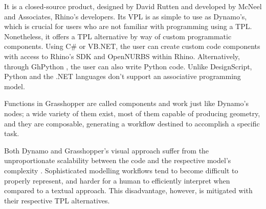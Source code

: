 It is a closed-source product, designed by David Rutten and developed by McNeel
and Associates, Rhino's developers.  Its \ac{VPL} is as simple to use as
Dynamo's, which is crucial for users who are not familiar with programming using
a \ac{TPL}.  Nonetheless, it offers a \ac{TPL} alternative by way of custom
programmatic components.  Using C\# or VB.NET, the user can create custom code
components with access to Rhino's \ac{SDK} and OpenNURBS
\cite{Lear:2018:openNURBS} within Rhino.  Alternatively, through GhPython
\cite{Giulio:2017:GhPython}, the user can also write Python code.  Unlike
DesignScript, Python and the .NET languages don't support an associative
programming model.

Functions in Grasshopper are called components and work just like Dynamo's
nodes; a wide variety of them exist, most of them capable of producing geometry,
and they are composable, generating a workflow destined to accomplish a specific
task.

Both Dynamo and Grasshopper's visual approach suffer from the unproportionate
scalability between the code and the respective model's complexity
\cite{Leitao:2014:PESLGD}.  Sophisticated modelling workflows tend to become
difficult to properly represent, and harder for a human to efficiently interpret
when compared to a textual approach.  This disadvantage, however, is mitigated
with their respective \ac{TPL} alternatives.
